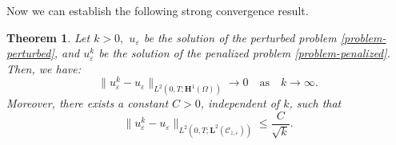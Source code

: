 \documentclass[a4paper,12pt,reqno,natbib]{amsart}
\newtheorem{theorem}{Theorem}
\def\H{\textbf{H}}
\def\L{\textbf{L}}
\begin{document}
Now we can establish the following strong convergence result.

\begin{theorem}\label{cv-penalized}
Let $k>0,$ $u_\varepsilon$ be the solution of the perturbed problem \eqref{problem-perturbed}, and $u_\varepsilon^k$ be the solution of the penalized problem \eqref{problem-penalized}. Then, we have:
 \begin{equation}\label{cvv-final}
        \big\| u_\varepsilon^k- u_\varepsilon \big\|_{L^2(0,T;\H^1(\Omega))}\longrightarrow0\quad\text{as}\quad k\longrightarrow\infty.
    \end{equation}
Moreover, there exists a constant $C>0$, independent of $k$, such that
\begin{equation}
    \big\| u_\varepsilon^k-u_\varepsilon \big\|_{L^2(0,T;\L^2(\mathcal{C}_{z,\varepsilon}))}\leq \frac{C}{\sqrt{k}}.
    \end{equation}
\end{theorem}
\end{document}
